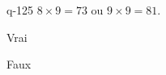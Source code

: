 \begin{truefalse}{q-125}
$8\times 9 = 73$ ou $9\times 9 = 81$.
\item* Vrai
\item Faux
\end{truefalse}

